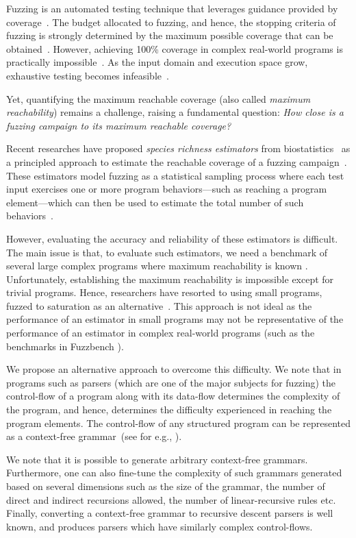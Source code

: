\documentclass[conference,anonymous,review]{IEEEtran}
\begin{document}
Fuzzing is an automated testing technique that leverages guidance provided
by coverage~\cite{boehme2016coverage}.
The budget allocated to fuzzing, and hence, the stopping criteria
of fuzzing is strongly determined by the maximum possible coverage that can
be obtained~\cite{fell2017review}.
%
However, achieving 100\% coverage in complex real-world programs is practically impossible~\cite{horgan1994achieving}. 
As the input domain and execution space grow, exhaustive testing becomes infeasible~\cite{knight1996exhaustive}.

Yet, quantifying the maximum reachable coverage (also called \emph{maximum reachability}) remains a challenge, raising a fundamental question:
\emph{How close is a fuzzing campaign to its maximum reachable coverage?}

Recent researches have proposed \emph{species richness estimators} from
biostatistics~\cite{chao2016species} as a principled approach to estimate
the reachable coverage of a fuzzing campaign~\cite{boehme2018stads}.
These estimators model fuzzing as a statistical sampling process where
each test input exercises one or more program behaviors---such as reaching
a program element---which can then be used to estimate the total number of such behaviors~\cite{boehme2018stads}.

However, evaluating the accuracy and reliability
of these estimators is difficult. The main issue is that, to evaluate such
estimators, we need a benchmark of several large complex programs where
maximum reachability is known \cite{liyanage2021security}. Unfortunately, establishing the maximum
reachability is impossible except for trivial programs. Hence, researchers have resorted to using small programs, fuzzed to saturation as an alternative~\cite{liyanage2023reachable}.
This approach is not ideal as the performance of an estimator in small  
programs may not be representative of the performance of an estimator in complex
real-world programs (such as the benchmarks in Fuzzbench \cite{metzman2021fuzzbench}).

We propose an alternative approach to overcome this difficulty. We note that
in programs such as parsers (which are one of the major subjects for fuzzing)
the control-flow of a program along with its data-flow determines the
complexity of the program, and hence, determines the difficulty
experienced in reaching the program elements. The control-flow of any
structured program can be represented as a context-free
grammar~(see for e.g., ).

We note that it is possible to generate arbitrary
context-free grammars. Furthermore, one can also fine-tune the complexity
of such grammars generated based on several dimensions such as the size
of the grammar, the number of direct and indirect recursions allowed, the
number of linear-recursive rules etc.
Finally, converting a context-free grammar to recursive descent
parsers is well known, and produces parsers which have similarly complex
control-flows.
\end{document}
